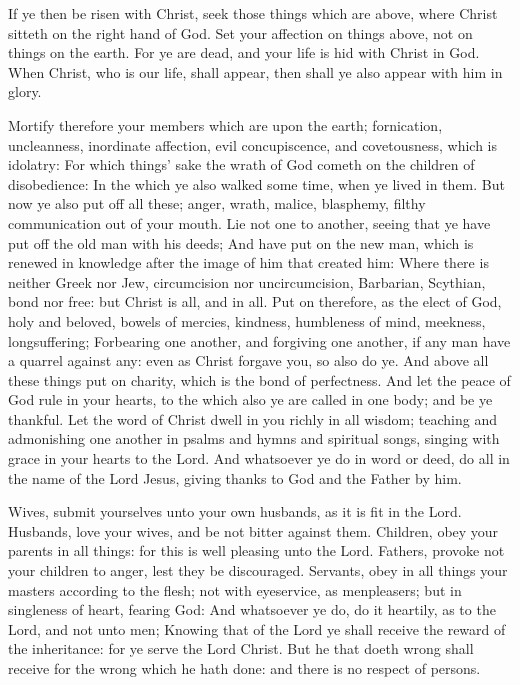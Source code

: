  If ye then be risen with Christ, seek those things which
are above, where Christ sitteth on the right hand of God. 
Set your affection on things above, not on things on the earth.
 For ye are dead, and your life is hid with Christ in God.
 When Christ, who is our life, shall appear, then shall ye
also appear with him in glory.

 Mortify therefore your members which are upon the earth;
fornication, uncleanness, inordinate affection, evil concupiscence, and
covetousness, which is idolatry:  For which things' sake the
wrath of God cometh on the children of disobedience:  In the
which ye also walked some time, when ye lived in them.  But
now ye also put off all these; anger, wrath, malice, blasphemy, filthy
communication out of your mouth.  Lie not one to another,
seeing that ye have put off the old man with his deeds; 
And have put on the new man, which is renewed in knowledge after the
image of him that created him:  Where there is neither
Greek nor Jew, circumcision nor uncircumcision, Barbarian, Scythian,
bond nor free: but Christ is all, and in all.  Put on
therefore, as the elect of God, holy and beloved, bowels of mercies,
kindness, humbleness of mind, meekness, longsuffering; 
Forbearing one another, and forgiving one another, if any man have a
quarrel against any: even as Christ forgave you, so also do ye.
 And above all these things put on charity, which is the
bond of perfectness.  And let the peace of God rule in your
hearts, to the which also ye are called in one body; and be ye thankful.
 Let the word of Christ dwell in you richly in all wisdom;
teaching and admonishing one another in psalms and hymns and spiritual
songs, singing with grace in your hearts to the Lord.  And
whatsoever ye do in word or deed, do all in the name of the Lord Jesus,
giving thanks to God and the Father by him.

 Wives, submit yourselves unto your own husbands, as it is
fit in the Lord.  Husbands, love your wives, and be not
bitter against them.  Children, obey your parents in all
things: for this is well pleasing unto the Lord.  Fathers,
provoke not your children to anger, lest they be discouraged.
 Servants, obey in all things your masters according to the
flesh; not with eyeservice, as menpleasers; but in singleness of heart,
fearing God:  And whatsoever ye do, do it heartily, as to
the Lord, and not unto men;  Knowing that of the Lord ye
shall receive the reward of the inheritance: for ye serve the Lord
Christ.  But he that doeth wrong shall receive for the
wrong which he hath done: and there is no respect of persons.

